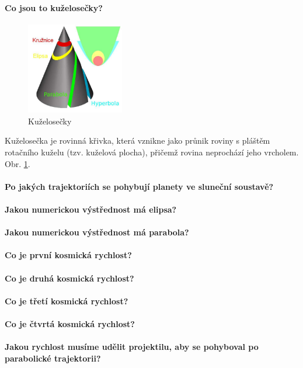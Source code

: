 \documentclass[11pt,a4paper,notitlepage,twocolumn]{article}
\begin{document}
\paragraph{Co jsou to kuželosečky?}
\begin{figure}[H]
\includegraphics[width=0.38\textwidth]{kuzelosecky}
\caption{Kuželosečky}
\label{fig:kuzelosecky}
\end{figure}
Kuželosečka je rovinná křivka, která vznikne jako průnik roviny s pláštěm rotačního kuželu
(tzv. kuželová plocha), přičemž rovina neprochází jeho vrcholem. Obr. \ref{fig:kuzelosecky}.
\paragraph{Po jakých trajektoriích se pohybují planety ve sluneční soustavě?}
\paragraph{Jakou numerickou výstřednost má elipsa?}
\paragraph{Jakou numerickou výstřednost má parabola?}
\paragraph{Co je první kosmická rychlost?}
\paragraph{Co je druhá kosmická rychlost?}
\paragraph{Co je třetí kosmická rychlost?}
\paragraph{Co je čtvrtá kosmická rychlost?}
\paragraph{Jakou rychlost musíme udělit projektilu, 
	aby se pohyboval po parabolické trajektorii?}
\end{document}
